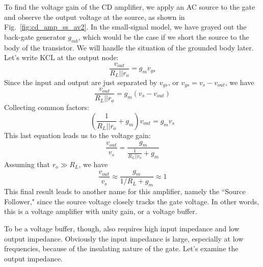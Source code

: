 To find the voltage gain of the CD amplifier, we apply an AC source to the gate and observe the output voltage at the source, as shown in Fig.~\ref{fig:cd_amp_ss_av2}.  In the small-signal model, we have grayed out the back-gate generator $g_{mb}$, which would be the case if we short the source to the body of the transistor.  We will handle the situation of the grounded body later. Let's write KCL at the output node:
\begin{equation}
	\frac{{{v_{out}}}}{{{R_L}||{r_o}}} = {g_m}{v_{gs}}
\end{equation}
Since the input and output are just separated by $v_{gs}$, or $v_{gs} = v_{s} - v_{out}$, we have
\begin{equation}
	\frac{{{v_{out}}}}{{{R_L}||{r_o}}} = {g_m}\left( {{v_{s}} - {v_{out}}} \right)
\end{equation}
Collecting common factors:
\begin{equation}
	\left( {\frac{1}{{{R_L}||{r_o}}} + {g_m}} \right){v_{out}} = {g_m}{v_{s}}
\end{equation}
This last equation leads us to the voltage gain:
\begin{equation}
	\frac{{{v_{out}}}}{{{v_{s}}}} = \frac{{{g_m}}}{{\frac{1}{{{R_L}||{r_o}}} + {g_m}}}
\end{equation}
Assuming that $r_o \gg R_L$, we have
\begin{equation}
	\frac{{{v_{out}}}}{{{v_{s}}}} \approx \frac{{{g_m}}}{{1/{R_L} + {g_m}}} \approx 1
\end{equation}
This final result leads to another name for this amplifier, namely the ``Source Follower," since the source voltage closely tracks the gate voltage.  In other words, this is a voltage amplifier with unity gain, or a voltage buffer.

To be a voltage buffer, though, also requires high input impedance and low output impedance.  Obviously the input impedance is large, especially at low frequencies, because of the insulating nature of the gate.  Let's examine the output impedance.
